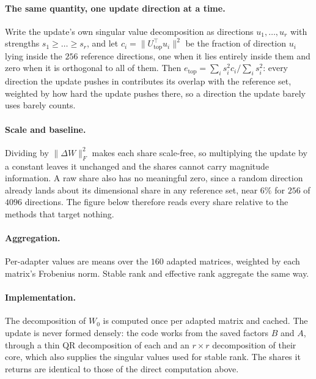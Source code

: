 \documentclass[11pt]{article}
\begin{document}
\paragraph{The same quantity, one update direction at a time.} Write the
update's own singular value decomposition as directions $u_1,\dots,u_r$ with
strengths $s_1 \ge \dots \ge s_r$, and let $c_i = \lVert
U_{\mathrm{top}}^{\!\top} u_i \rVert^2$ be the fraction of direction $u_i$
lying inside the $256$ reference directions, one when it lies entirely inside
them and zero when it is orthogonal to all of them. Then $e_{\mathrm{top}} =
\sum_i s_i^2 c_i / \sum_i s_i^2$: every direction the update pushes in
contributes its overlap with the reference set, weighted by how hard the
update pushes there, so a direction the update barely uses barely counts.

\paragraph{Scale and baseline.} Dividing by $\lVert\Delta W\rVert_F^2$ makes
each share scale-free, so multiplying the update by a constant leaves it
unchanged and the shares cannot carry magnitude information. A raw share also
has no meaningful zero, since a random direction already lands about its
dimensional share in any reference set, near $6\%$ for $256$ of $4096$
directions. The figure below therefore reads every share relative to the
methods that target nothing.

\paragraph{Aggregation.} Per-adapter values are means over the $160$ adapted
matrices, weighted by each matrix's Frobenius norm. Stable rank and effective
rank aggregate the same way.

\paragraph{Implementation.} The decomposition of $W_0$ is computed once per
adapted matrix and cached. The update is never formed densely: the code works
from the saved factors $B$ and $A$, through a thin QR decomposition of each
and an $r \times r$ decomposition of their core, which also supplies the
singular values used for stable rank. The shares it returns are identical to
those of the direct computation above.
\end{document}
